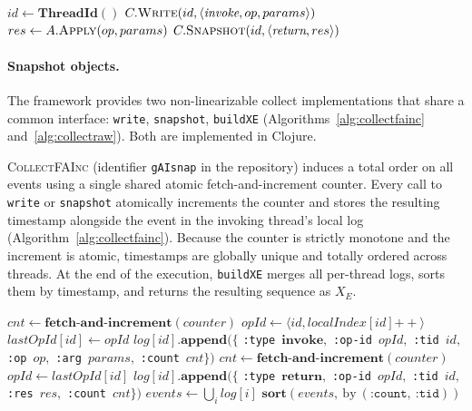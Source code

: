 \documentclass[preprint,12pt]{elsarticle}
\begin{document}
\begin{algorithm}[H]
\scriptsize
\caption{Wrapper: distributed instrumentation mechanism}
\label{alg:wrapper}
\begin{algorithmic}[1]
  \State $id \gets \textbf{ThreadId}()$
  \State $C.\textsc{Write}(id, \langle \textit{invoke}, op, params \rangle)$
  \State $res \gets A.\textsc{Apply}(op, params)$
  \State $C.\textsc{Snapshot}(id, \langle \textit{return}, res \rangle)$
\EndProcedure
\end{algorithmic}
\end{algorithm}

\paragraph{Snapshot objects.}
The framework provides two non-linearizable collect implementations that
share a common interface: \texttt{write}, \texttt{snapshot}, \texttt{buildXE} (Algorithms~\ref{alg:collectfainc} and~\ref{alg:collectraw}).
Both are implemented in Clojure.


\textsc{CollectFAInc} (identifier \texttt{gAIsnap} in the repository)
induces a total order on all events using a single shared atomic
fetch-and-increment counter. Every call to \texttt{write} or \texttt{snapshot}
atomically increments the counter and stores the resulting timestamp alongside
the event in the invoking thread's local log
(Algorithm~\ref{alg:collectfainc}). Because the counter is strictly monotone
and the increment is atomic, timestamps are globally unique and totally ordered
across threads. At the end of the execution, \texttt{buildXE} merges all
per-thread logs, sorts them by timestamp,
and returns the resulting sequence as $X_E$.

\begin{algorithm}[H]
\scriptsize
\caption{\textsc{CollectFAInc}: write and snapshot}
\label{alg:collectfainc}
\begin{algorithmic}[1]
  \State $cnt \gets \textbf{fetch-and-increment}(counter)$
  \State $opId \gets \langle id, localIndex[id]\mathtt{++} \rangle$
  \State $lastOpId[id] \gets opId$
  \State $log[id].\textbf{append}(\{$
      \texttt{:type}~$\mathbf{invoke},$
      \texttt{:op-id}~$opId,$
      \texttt{:tid}~$id,$
      \texttt{:op}~$op,$
      \texttt{:arg}~$params,$
      \texttt{:count}~$cnt\})$
\EndProcedure
{}
  \State $cnt \gets \textbf{fetch-and-increment}(counter)$
  \State $opId \gets lastOpId[id]$
  \State $log[id].\textbf{append}(\{$
      \texttt{:type}~$\mathbf{return},$
      \texttt{:op-id}~$opId,$
      \texttt{:tid}~$id,$
      \texttt{:res}~$res,$
      \texttt{:count}~$cnt\})$
\EndProcedure
{}
  \State $events \gets \bigcup_{i} log[i]$
  \State \Return $\textbf{sort}(events,\ \text{by}\ (\texttt{:count},\ \texttt{:tid}))$
\EndProcedure
\end{algorithmic}
\end{algorithm}
\end{document}

